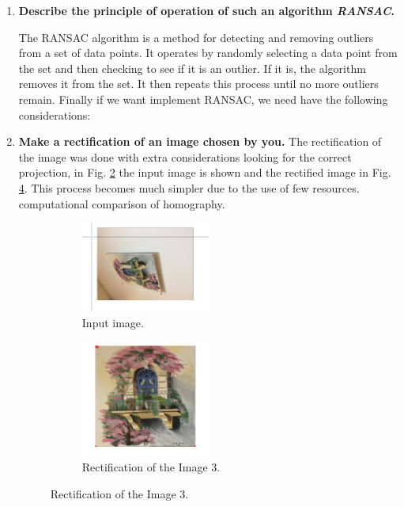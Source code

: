 \documentclass[12pt, twoside]{report}
\begin{document}
\begin{enumerate}
\begin{figure}[H]
     \hfill 
        \caption{Homography with images from the campus.}
        \label{fig:campusP}
\end{figure}

\item \textbf{Describe the principle of operation of such an algorithm \textit{RANSAC}.}

The RANSAC algorithm is a method for detecting and removing outliers from a set of data points. It operates by randomly selecting a data point from the set and then checking to see if it is an outlier. If it is, the algorithm removes it from the set. It then repeats this process until no more outliers remain. Finally if we want implement RANSAC, we need have the following considerations:
\item \textbf{Make a rectification of an image chosen by you.}
The rectification of the image was done with extra considerations looking for the correct projection, in Fig. \ref{fig:fig1_rect2} the input image is shown and the rectified image in Fig. \ref{fig:fig1_rect}. This process becomes much simpler due to the use of few resources. computational comparison of homography.
\begin{figure}[H]

     \centering
     \begin{subfigure}[b]{0.9\textwidth}
         \centering
         \includegraphics[width=0.5\textwidth]{images/rect0.jpg}
    \caption{Input image.}
    \label{fig:fig1_rect2}
     \end{subfigure}
     \hfill
     \begin{subfigure}[b]{0.9\textwidth}
         \centering
         \includegraphics[width=0.5\textwidth]{images/rect1.jpg}
    \caption{Rectification of the Image 3.}
    \label{fig:fig1_rect}
     \end{subfigure}
     

\end{figure}
\end{enumerate}
\end{document}
